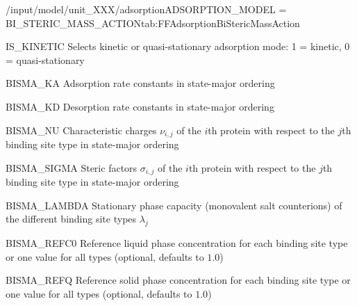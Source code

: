 \begin{condsubgroup}{/input/model/unit\_XXX/adsorption}{ADSORPTION\_MODEL = BI\_STERIC\_MASS\_ACTION}{tab:FFAdsorptionBiStericMassAction}
\begin{dataset}[type=int,range={$\{ 0,1 \}$},length=1]{IS\_KINETIC}
    Selects kinetic or quasi-stationary adsorption mode: 1 = kinetic, 0 = quasi-stationary
  \end{dataset}
  \begin{dataset}[unit=\si{\raiseto{3}\metre\of{MP}\per\raiseto{3}\metre\of{SP}\per\second}, type = double, range={$\geq 0.0$}, length={$\texttt{NSTATES} \cdot \texttt{NCOMP}$}]{BISMA\_KA} 
    Adsorption rate constants in state-major ordering
  \end{dataset} 
  \begin{dataset}[unit=\si{\per\second}, type = double, range={$\geq 0.0$}, length={$\texttt{NSTATES} \cdot \texttt{NCOMP}$}]{BISMA\_KD} 
    Desorption rate constants in state-major ordering
  \end{dataset} 
  \begin{dataset}[unit=\si{\per\second}, type = double, range={$\geq 0.0$}, length={$\texttt{NSTATES} \cdot \texttt{NCOMP}$}]{BISMA\_NU} 
    Characteristic charges $\nu_{i,j}$ of the $i$th protein with respect to the $j$th binding site type in state-major ordering
  \end{dataset} 
  \begin{dataset}[unit=\si{\per\second}, type = double, range={$\geq 0.0$}, length={$\texttt{NSTATES} \cdot \texttt{NCOMP}$}]{BISMA\_SIGMA} 
    Steric factors $\sigma_{i,j}$ of the $i$th protein with respect to the $j$th binding site type in state-major ordering
  \end{dataset} 
  \begin{dataset}[unit=\si{\mol\per\cubic\metre\of{SP}}, type = double, range={$\geq 0.0$}, length={\texttt{NSTATES}}]{BISMA\_LAMBDA} 
    Stationary phase capacity (monovalent salt counterions) of the different binding site types $\lambda_j$
  \end{dataset}
  \begin{dataset}[unit=\si{\mol\per\raiseto{3}\metre\of{MP}}, type = double, range={$> 0$}, length={$\{1,\texttt{NSTATES}\}$}]{BISMA\_REFC0} 
    Reference liquid phase concentration for each binding site type or one value for all types (optional, defaults to $1.0$)
  \end{dataset} 
  \begin{dataset}[unit=\si{\mol\per\raiseto{3}\metre\of{SP}}, type = double, range={$> 0$}, length={$\{1,\texttt{NSTATES}\}$}]{BISMA\_REFQ} 
    Reference solid phase concentration for each binding site type or one value for all types (optional, defaults to $1.0$)
  \end{dataset} 
\end{condsubgroup}

